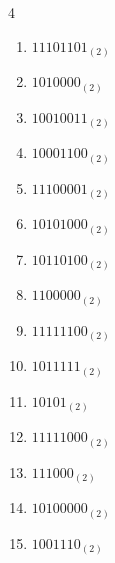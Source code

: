 \begin{multicols}{4}
\begin{enumerate}
        \phantom{$=39$}

  \item $11101101_{(2)}$

        \phantom{$=237$}

\columnbreak %

\resetques

  \item $1010000_{(2)}$

        \phantom{$=80$}

  \item $10010011_{(2)}$

        \phantom{$=147$}

  \item $10001100_{(2)}$

        \phantom{$=140$}

  \item $11100001_{(2)}$

        \phantom{$=225$}

  \item $10101000_{(2)}$

        \phantom{$=168$}

  \item $10110100_{(2)}$

        \phantom{$=180$}

  \item $1100000_{(2)}$

        \phantom{$=96$}

  \item $11111100_{(2)}$

        \phantom{$=252$}

  \item $1011111_{(2)}$

        \phantom{$=95$}

  \item $10101_{(2)}$

        \phantom{$=21$}

  \item $11111000_{(2)}$

        \phantom{$=248$}

  \item $111000_{(2)}$

        \phantom{$=56$}

  \item $10100000_{(2)}$

        \phantom{$=160$}

  \item $1001110_{(2)}$


\end{enumerate}
\end{multicols}
